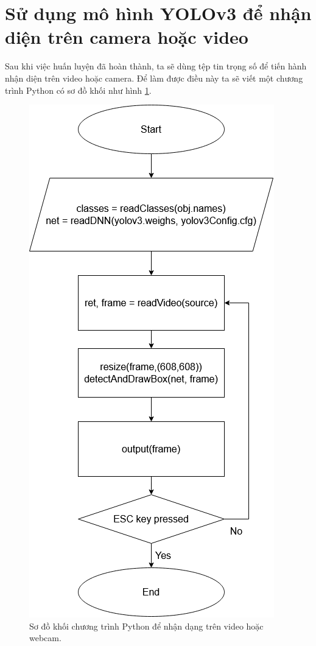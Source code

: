 \section{Sử dụng mô hình YOLOv3 để nhận diện trên camera hoặc video}

Sau khi việc huấn luyện đã hoàn thành, ta sẽ dùng tệp tin trọng số để tiến hành nhận diện trên video hoặc camera. Để làm được điều này ta sẽ viết một chương trình Python có sơ đồ khối như hình \ref{fig:flow_chart}.
\begin{figure}[ht!]
	\centerline{\includegraphics[scale=0.6]{images/flow_chart.png}}
  	\caption{Sơ đồ khối chương trình Python để nhận dạng trên video hoặc webcam.}
  	\label{fig:flow_chart}
\end{figure}

